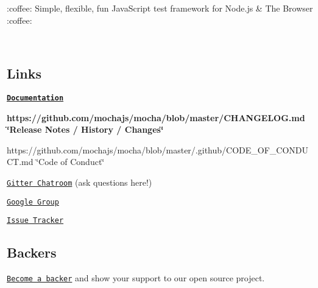  

\+:coffee\+: Simple, flexible, fun Java\+Script test framework for Node.\+js \& The Browser \+:coffee\+:

\href{http://travis-ci.org/mochajs/mocha}{\tt } \href{https://coveralls.io/github/mochajs/mocha}{\tt } \href{https://app.fossa.io/projects/git%2Bhttps%3A%2F%2Fgithub.com%2Fmochajs%2Fmocha?ref=badge_shield}{\tt } \href{https://gitter.im/mochajs/mocha?utm_source=badge&utm_medium=badge&utm_campaign=pr-badge&utm_content=badge}{\tt } \href{https://github.com/mochajs/mocha#backers}{\tt } \href{https://github.com/mochajs/mocha#sponsors}{\tt } 

~\newline


\subsection*{Links}


\begin{DoxyItemize}
\item {\bfseries \href{https://mochajs.org}{\tt Documentation}}
\item {\bfseries https\+://github.com/mochajs/mocha/blob/master/\+C\+H\+A\+N\+G\+E\+L\+O\+G.\+md \char`\"{}\+Release Notes / History / Changes\char`\"{}}
\item https\+://github.com/mochajs/mocha/blob/master/.github/\+C\+O\+D\+E\+\_\+\+O\+F\+\_\+\+C\+O\+N\+D\+U\+C\+T.\+md \char`\"{}\+Code of Conduct\char`\"{}
\item \href{https://gitter.im/mochajs/mocha}{\tt Gitter Chatroom} (ask questions here!)
\item \href{https://groups.google.com/group/mochajs}{\tt Google Group}
\item \href{https://github.com/mochajs/mocha/issues}{\tt Issue Tracker}
\end{DoxyItemize}

\subsection*{Backers}

\href{https://opencollective.com/mochajs#backer}{\tt Become a backer} and show your support to our open source project.

